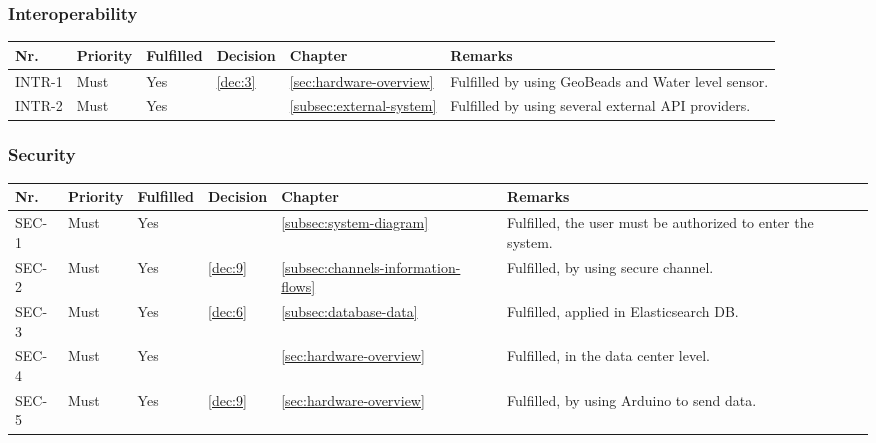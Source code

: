 \subsubsection{Interoperability}
\begin{table}[H]
	\begin{tabular}{lllllL{}}
	
		Nr.    & Priority & Fulfilled & Decision & Chapter & Remarks \\ \hline
		INTR-1 & Must     & Yes      & \ref{dec:3} & \ref{sec:hardware-overview} & Fulfilled by using GeoBeads and Water level sensor. \\ \hline
		INTR-2 & Must     & Yes      & &\ref{subsec:external-system} & Fulfilled by using several external API providers.       \\ \hline
						
	\end{tabular}
\end{table}

\subsubsection{Security}
\begin{table}[H]
	\begin{tabular}{lllllL{}}
		Nr.   & Priority & Fulfilled & Decision & Chapter & Remarks \\ \hline
		SEC-1 & Must     & Yes      & & \ref{subsec:system-diagram} & Fulfilled, the user must be authorized to enter the system. \\ \hline
		SEC-2 & Must     & Yes      & \ref{dec:9} & \ref{subsec:channels-information-flows} & Fulfilled, by using secure channel. \\ \hline
		SEC-3 & Must     & Yes      & \ref{dec:6} & \ref{subsec:database-data} & Fulfilled, applied in Elasticsearch DB. \\ \hline
		SEC-4 & Must     & Yes      & & \ref{sec:hardware-overview} & Fulfilled, in the data center level. \\ \hline
		SEC-5 & Must     & Yes      & \ref{dec:9} & \ref{sec:hardware-overview} & Fulfilled, by using Arduino to send data. \\ \hline
						
	\end{tabular}
\end{table}

